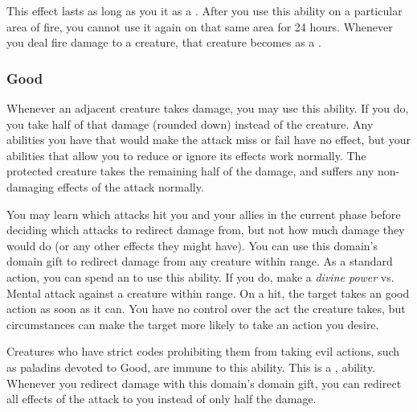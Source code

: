             This effect lasts as long as you  it as a .
            After you use this ability on a particular area of fire, you cannot use it again on that same area for 24 hours.
             Whenever you deal fire damage to a creature, that creature becomes \ignited as a .

        \subsubsection{Good}
             Whenever an adjacent creature takes damage, you may use this ability.
            If you do, you take half of that damage (rounded down) instead of the creature.
            Any abilities you have that would make the attack miss or fail have no effect, but your abilities that allow you to reduce or ignore its effects work normally.
            The protected creature takes the remaining half of the damage, and suffers any non-damaging effects of the attack normally.
            \par You may learn which attacks hit you and your allies in the current phase before deciding which attacks to redirect damage from, but not how much damage they would do (or any other effects they might have).
             You can use this domain's domain gift to redirect damage from any creature within \rngclose range.
             As a standard action, you can spend an  to use this ability.
            If you do, make a \textit{divine power} vs. Mental attack against a creature within \rngmed range.
            On a hit, the target takes an good action as soon as it can.
            You have no control over the act the creature takes, but circumstances can make the target more likely to take an action you desire.

            Creatures who have strict codes prohibiting them from taking evil actions, such as paladins devoted to Good, are immune to this ability.
            This is a ,  ability.
             Whenever you redirect damage with this domain's domain gift, you can redirect all effects of the attack to you instead of only half the damage.

